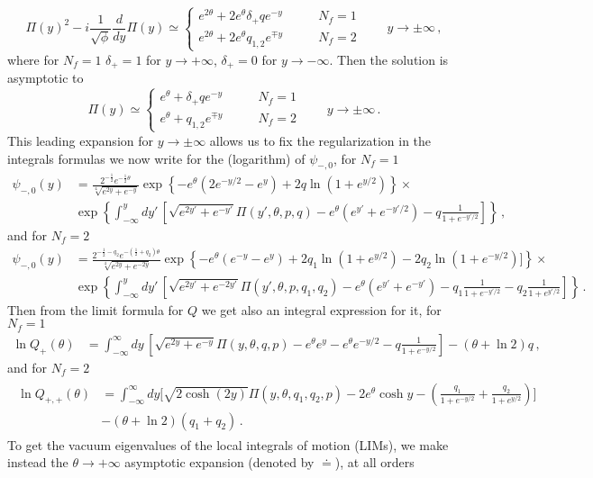 \documentclass[11pt,a4paper]{elsarticle}
\def \th {\theta}
\def \ba {\begin{aligned}}
\def \ea {\end{aligned}}
\newcommand{\be}{\begin{equation}}
\newcommand{\ee}{\end{equation}}
\def\th{\theta}
\numberwithin{figure}{section}
\numberwithin{table}{section}
\begin{document}
\be 
\Pi(y)^2 - i \frac{1}{\sqrt{\phi}}\frac{d}{dy}\Pi(y)  \simeq \begin{cases}
e^{2\th}+2 e^\th \delta_+ q e^{-y} \qquad &N_f=1\\
e^{2\th}+2e^\th q_{1,2} e^{\mp y} \qquad &N_f=2 
\end{cases} \qquad y \to \pm \infty \,,
\ee 
where for $N_f=1$ $\delta_+=1$ for $y \to +\infty$, $\delta_+=0$ for $y \to -\infty$.
Then the solution is asymptotic to
\be 
\Pi(y)\simeq \begin{cases}
 e^\th + \delta_+ q e^{-y} \qquad &N_f=1\\
e^\th +  q_{1,2} e^{\mp y} \qquad &N_f=2 
\end{cases} \qquad y \to \pm \infty\,.
\ee
This leading expansion for $y \to \pm \infty$ allows us to fix the regularization in the integrals formulas we now write for the (logarithm) of $\psi_{-,0}$, for $N_f=1$
\be 
\ba \label{psi-0exact1}
\psi_{-,0}(y)&=\frac{2^{-\frac{1}{2}}e^{-\frac{1}{2}\th}}{\sqrt[4]{e^{2y}+e^{-y}}}\exp \left \{- e^\th (2e^{-y/2}-e^y)+2q  \ln (1+e^{y/2}) \right \}\times
 \\
 &\exp\left \{ \int_{-\infty}^y d y'\, \left[ \sqrt{e^{2y'}+e^{-y'}} \Pi(y',\th,p,q)-e^\th \left(e^{y'}+e^{-y'/2}\right)-q  \frac{1}{1+e^{-y'/2}} \right] \right\}\,,
\ea
\ee 
and for $N_f=2$ 
\be 
\ba 
\psi_{-,0}(y)&=\frac{2^{-\frac{1}{2}-q_2}e^{-(\frac{1}{2}+q_2)\th}}{\sqrt[4]{e^{2y}+e^{-2y}}}\exp \left \{-  e^\th(e^{-y}-e^y)+2q_1  \ln (1+e^{y/2})-2q_2   \ln (1+e^{-y/2})] \right \}\times
 \\
 &\exp\left \{ \int_{-\infty}^y d y'\, \left[ \sqrt{e^{2y'}+e^{-2y'}} \Pi(y',\th,p,q_1,q_2)- e^\th (e^{y'}+e^{-y'})-q_1 \frac{1}{1+e^{-y'/2}}-q_2 \frac{1}{1+e^{y'/2}}  \right] \right\}\,.
\ea
\ee
Then from the limit formula for $Q$ we get also an integral expression for it, for $N_f=1$
\be 
\ba \label{lnQPi}
\ln Q_+(\th) &=  \int_{-\infty}^\infty  d y\,\left[\sqrt{e^{2y}+e^{-y} }\Pi(y,\th,q,p)-e^\th e^y - e^\th e^{-y/2} -q  \frac{1}{1+e^{-y/2}} \right]  -\left(\th + \ln 2\right)q\,,
\ea 
\ee 
and for $N_f=2$
\begin{align}  \label{Q2++}\begin{split}
\ln Q_{+,+}(\th) &=\int_{-\infty}^\infty d y\biggl[\sqrt{2 \cosh (2y) } \Pi(y,\th,q_1,q_2,p)- 2e^{\th}\cosh y -  \left(\frac{q_1}{1+e^{-y/2}}+\frac{q_2}{1+e^{y/2}} \right) \biggr]\\
&-\left(\th+ \ln 2 \right) (q_1+q_2)\,.
\end{split}
\end{align}
To get the vacuum eigenvalues of the local integrals of motion (LIMs), we make instead the $\th\to +\infty$ asymptotic expansion (denoted by $\doteq$), at all orders
\end{document}
